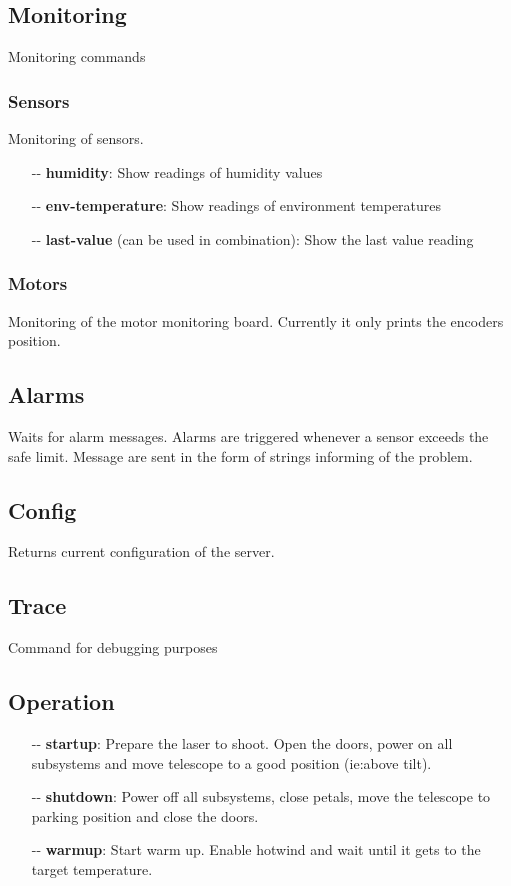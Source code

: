 \documentclass[letterpaper, 10 pt]{article}
\begin{document}
\subsection{Monitoring}
Monitoring commands
\subsubsection{Sensors}
Monitoring of sensors. 
\begin{itemize}
	\item[-{}-] \textbf{humidity}: Show readings of humidity values 
	\item[-{}-] \textbf{env-temperature}: Show readings of environment temperatures
	\item[-{}-] \textbf{last-value} (can be used in combination): Show the last value reading
\end{itemize}
\subsubsection{Motors}
Monitoring of the motor monitoring board. Currently it only prints the encoders position.

\subsection{Alarms}
Waits for alarm messages. Alarms are triggered whenever a sensor exceeds the safe limit. Message are sent in the form of strings informing of the problem.

\subsection{Config}
Returns current configuration of the server.

\subsection{Trace}
Command for debugging purposes

\subsection{Operation} \label{operationcmds}
\begin{itemize}
	\item[-{}-] \textbf{startup}: Prepare the laser to shoot. Open the doors, power on all subsystems and move telescope to a good position (ie:above tilt).
	\item[-{}-] \textbf{shutdown}: Power off all subsystems, close petals, move the telescope to parking position and close the doors.
	\item[-{}-] \textbf{warmup}: Start warm up. Enable hotwind and wait until it gets to the target temperature.
\end{itemize}
\end{document}
